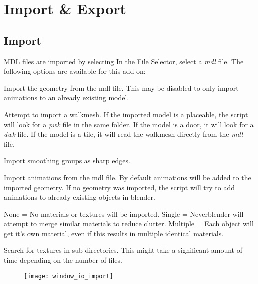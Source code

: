 \chapter{Import \& Export}

\section{Import}
MDL files are imported by selecting  In the File Selector, 
select a \textit{mdl} file. The following options are available for this add-on: 

\begin{description}[leftmargin=13em,style=nextline]
    \item[Import Geometry] Import the geometry from the mdl file. This may be disabled to only import animations to an already existing model.
    \item[Import Walkmesh] Attempt to import a walkmesh. If the imported model is a placeable, the script will look for a {\textit{pwk}} file in the same folder. If the model is a door, it will look for a {\textit{dwk}} file. If the model is a tile, it will read the walkmesh directly from the \textit{mdl} file.
    \item[Import Smooth Groups] Import smoothing groups as sharp edges.
    \item[Import Animations] Import animations from the mdl file. By default animations will be added to the imported geometry. If no geometry was imported, the script will try to add animations to already existing objects in blender.
    \item[Materials] None = No materials or textures will be imported. Single = Neverblender will attempt to merge similar materials to reduce clutter. Multiple = Each object will get it's own material, even if this results in multiple identical materials.
    \item[Image Search] Search for textures in sub-directories. This might take a significant amount of time depending on the number of files.
\end{description}

\begin{figure}[hb]
    \centering
    \texttt{[image: window\_io\_import]}
\end{figure}


